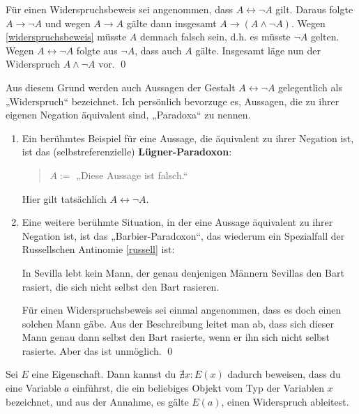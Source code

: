 \begin{bew}
    Für einen Widerspruchsbeweis sei angenommen, dass $A\leftrightarrow \neg A$ gilt. Daraus folgte $A\to \neg A$ und wegen $A\to A$ gälte dann insgesamt $A\to (A\land \neg A)$. Wegen \cref{widerspruchsbeweis} müsste $A$ demnach falsch sein, d.h. es müsste $\neg A$ gelten. Wegen $A\leftrightarrow \neg A$ folgte aus $\neg A$, dass auch $A$ gälte. Insgesamt läge nun der Widerspruch $A\land \neg A$ vor. \qed
\end{bew}



\begin{bsp}[*] \label{bsp:paradox}
    Aus diesem Grund werden auch Aussagen der Gestalt $A\leftrightarrow \neg A$ gelegentlich als „Widerspruch“ bezeichnet.  Ich persönlich bevorzuge es, Aussagen, die zu ihrer eigenen Negation äquivalent sind, „Paradoxa“ zu nennen.
    \begin{enumerate}
        \item Ein berühmtes Beispiel für eine Aussage, die äquivalent zu ihrer Negation ist, ist das (selbstreferenzielle) \textbf{Lügner-Paradoxon}:
        \begin{quote}
            $A:=$ „Diese Aussage ist falsch.“
        \end{quote}
        Hier gilt tatsächlich $A\leftrightarrow \neg A$.
        \item Eine weitere berühmte Situation, in der eine Aussage äquivalent zu ihrer Negation ist, ist das „Barbier-Paradoxon“, das wiederum ein Spezialfall der Russellschen Antinomie \cref{russell} ist:
        \begin{satz}
            In Sevilla lebt kein Mann, der genau denjenigen Männern Sevillas den Bart rasiert, die sich nicht selbst den Bart rasieren.
        \end{satz}
        \begin{bew}
            Für einen Widerspruchsbeweis sei einmal angenommen, dass es doch einen solchen Mann gäbe. Aus der Beschreibung leitet man ab, dass sich dieser Mann genau dann selbst den Bart rasierte, wenn er ihn sich nicht selbst rasierte. Aber das ist unmöglich. \qed
        \end{bew}
    \end{enumerate}
\end{bsp}

  
\begin{satz} \label{existenzwiderleg}
    Sei $E$ eine Eigenschaft. Dann kannst du $\nexists x: E(x)$ dadurch beweisen, dass du eine Variable $a$ einführst, die ein beliebiges Objekt vom Typ der Variablen $x$ bezeichnet, und aus der Annahme, es gälte $E(a)$, einen Widerspruch ableitest.
\end{satz}


